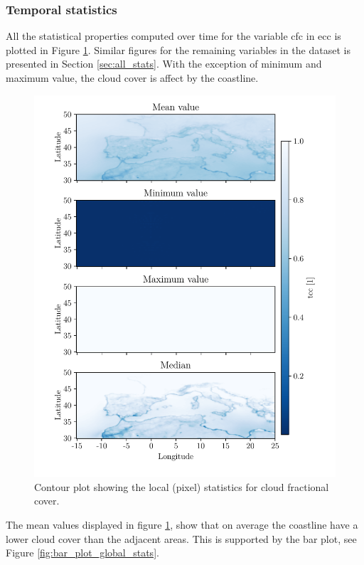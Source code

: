 \subsubsection{Temporal statistics}
All the statistical properties computed over time for the variable \acrshort{cfc} in \acrshort{ecc} is plotted in 
Figure \ref{fig:all_stats_tcc}. Similar figures for the remaining variables in the dataset is presented in Section \ref{sec:all_stats}. %
With the exception of minimum and maximum value, the cloud cover is affect by the coastline. 
\begin{figure}[ht]
    \centering
    \includegraphics{python_figs/all_stat_variable_tcc.pdf}
    \caption{Contour plot showing the local (pixel) statistics for cloud fractional cover.}
    \label{fig:all_stats_tcc}
\end{figure}

The mean values displayed in figure \ref{fig:all_stats_tcc}, show that on average the coastline have a lower cloud cover than the adjacent areas. This is supported by the bar plot, see Figure \ref{fig:bar_plot_global_stats}. 

